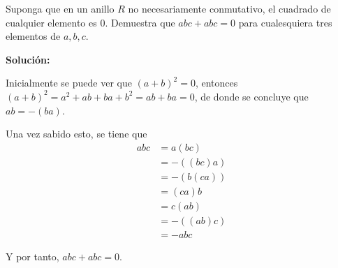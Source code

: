 \documentclass[../../main.tex]{subfiles}
\begin{document}
  \begin{shaded}
    Suponga que en un anillo $R$ no necesariamente conmutativo, el cuadrado de cualquier elemento es $0$. Demuestra que $abc + abc = 0$ para cualesquiera tres elementos de $a, b, c$.
  \end{shaded}

  \textbf{Solución:}

  Inicialmente se puede ver que $(a + b)^2 = 0$, entonces $(a + b)^2 = a^2 + ab + ba + b^2 = ab + ba = 0$, de donde se concluye que $ab = - (ba)$.

  Una vez sabido esto, se tiene que
  \begin{equation*}
    \begin{split}
      abc & = a (bc) \\ & =
      - ((bc) a) \\ & =
      - (b (ca)) \\ & =
      (ca) b \\ & =
      c (ab) \\ & =
      - ((ab) c) \\ & =
      - abc
    \end{split}
  \end{equation*}

  Y por tanto, $abc + abc = 0$.
\end{document}
